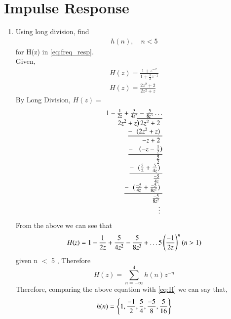 \documentclass[journal,12pt,twocolumn]{IEEEtran}
\renewcommand\thesection{\arabic{section}}
\begin{document}
\section{Impulse Response}
\begin{enumerate}[label=\thesection.\arabic*]
\item Using long division, 
find
		\begin{align}
			h(n), \quad n < 5
		\end{align}
		for H(z) in 
		\eqref{eq:freq_resp}.
\\
\solution Given,
\begin{align}
     H(z) = \frac{1 + z^{-2}}{1 + \frac{1}{2}z^{-1}}
     \\
     H(z) = \frac{2z^{2}+2}{2z^{2}+z}
\end{align}
By Long Division, $H(z)=$
\begin{align}
    \begin{array}{r}
         1-\frac{1}{2z}+\frac{5}{4z^2}-\frac{5}{8z^3}\ldots  \\
         2z^2+z{\overline{\smash{\big)}\,2z^2 + 2\phantom{)}}}\\
         \underline{-~\phantom{(}(2z^2 + z)\phantom{)}}\\
         -z + 2\phantom{)}\\ 
        \underline{-~\phantom{()}(-z-\frac{1}{2})}\\ 
        \frac{5}{2}\phantom{)} \\
        \underline{-~\phantom{(}(\frac{5}{2} + \frac{5}{4z})\phantom{)}}\\
        \frac{-5}{4z}\phantom{)}\\
        \underline{-~\phantom{(}(\frac{-5}{4z} + \frac{-5}{8z^2})\phantom{)}}\\
        \frac{-5}{8z^2}\phantom{)}\\
        \vdots\phantom{)}
    \end{array}
\end{align}
From the above we can see that 
\begin{equation}
\label{eq:H}
    H(z) = 1 - \frac{1}{2z} + \frac{5}{4z^{2}} - \frac{5}{8z^{3}} + \ldots 5\left(\frac{-1}{2z}\right)^{n} (n>1)
\end{equation}
given n $<$ 5 , Therefore 
\begin{equation}
    H(z) = \sum _{n=-\infty }^{4}h(n)z^{-n}
\end{equation}
Therefore, comparing the above equation with \eqref{eq:H} we can say that,
\begin{equation}
    h(n) = \left\{1,\frac{-1}{2},\frac{5}{4},\frac{-5}{8},\frac{5}{16}\right\}
\end{equation}



\end{enumerate}
\end{document}
